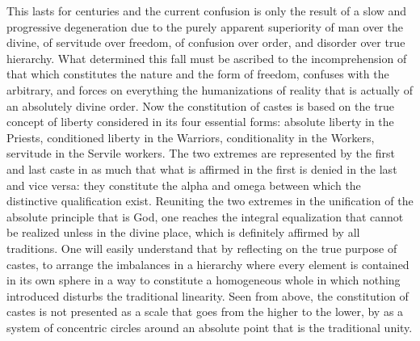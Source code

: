 This lasts for centuries and the current confusion is only the result of a slow and progressive degeneration due to the purely apparent superiority of man over the divine, of servitude over freedom, of confusion over order, and disorder over true hierarchy. What determined this fall must be ascribed to the incomprehension of that which constitutes the nature and the form of freedom, confuses with the arbitrary, and forces on everything the humanizations of reality that is actually of an absolutely divine order. Now the constitution of castes is based on the true concept of liberty considered in its four essential forms: absolute liberty in the Priests, conditioned liberty in the Warriors, conditionality in the Workers, servitude in the Servile workers. The two extremes are represented by the first and last caste in as much that what is affirmed in the first is denied in the last and vice versa: they constitute the alpha and omega between which the distinctive qualification exist. Reuniting the two extremes in the unification of the absolute principle that is God, one reaches the integral equalization that cannot be realized unless in the divine place, which is definitely affirmed by all traditions. One will easily understand that by reflecting on the true purpose of castes, to arrange the imbalances in a hierarchy where every element is contained in its own sphere in a way to constitute a homogeneous whole in which nothing introduced disturbs the traditional linearity. Seen from above, the constitution of castes is not presented as a scale that goes from the higher to the lower, by as a system of concentric circles around an absolute point that is the traditional unity.

